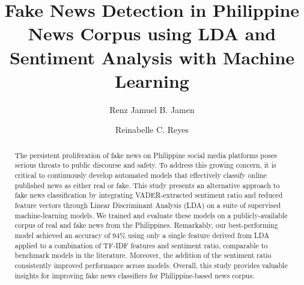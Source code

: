 \documentclass[10pt,a4paper,twoside]{article}
\begin{document}
\title{\TitleFont Fake News Detection in Philippine News Corpus using LDA and Sentiment Analysis with Machine Learning}
\vspace{-1.5em}
\author[*\negthickspace]{Renz Jamuel B. Jamen}
\author[ ]{Reinabelle C. Reyes\lastauthorsep}


\begin{abstract}
\noindent
The persistent proliferation of fake news on Philippine social media platforms poses serious threats to public discourse and safety. To address this growing concern, it is critical to continuously develop automated models that effectively classify online published news as either real or fake. This study presents an alternative approach to fake news classification by integrating VADER-extracted sentiment ratio and reduced feature vectors through Linear Discriminant Analysis (LDA) on a suite of supervised machine-learning models. We trained and evaluate these models on a publicly-available corpus of real and fake news from the Philippines. Remarkably, our best-performing model achieved an accuracy of 94\% using only a single feature derived from LDA applied to a combination of TF-IDF features and sentiment ratio, comparable to benchmark models in the literature. Moreover, the addition of the sentiment ratio consistently improved performance across models. Overall, this study provides valuable insights for improving fake news classifiers for Philippine-based news corpus.


\end{abstract}

\maketitle
\thispagestyle{titlestyle}


\end{document}
